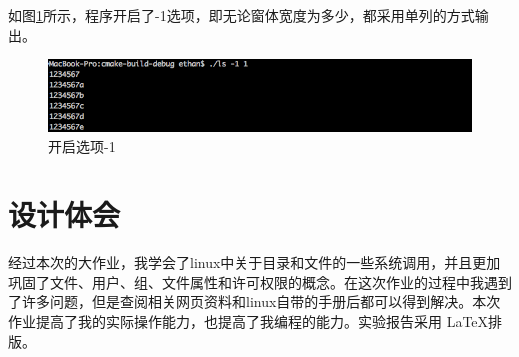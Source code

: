 \documentclass[UTF8,zihao=5,AutoFakeBold]{ctexart}
\begin{document}
如图\ref{fig:myls_1}所示，程序开启了-1选项，即无论窗体宽度为多少，都采用单列的方式输出。
\begin{figure}[h!]
    \centering
    \includegraphics[width=0.7\linewidth]{myls-1}
    \caption{开启选项-1}
    \label{fig:myls_1}
\end{figure}

\newpage
\section{设计体会}

经过本次的大作业，我学会了linux中关于目录和文件的一些系统调用，并且更加巩固了文件、用户、组、文件属性和许可权限的概念。在这次作业的过程中我遇到了许多问题，但是查阅相关网页资料和linux自带的手册后都可以得到解决。本次作业提高了我的实际操作能力，也提高了我编程的能力。实验报告采用 \LaTeX 排版。

\newpage
\printbibliography[heading=bibintoc]
\end{document}
